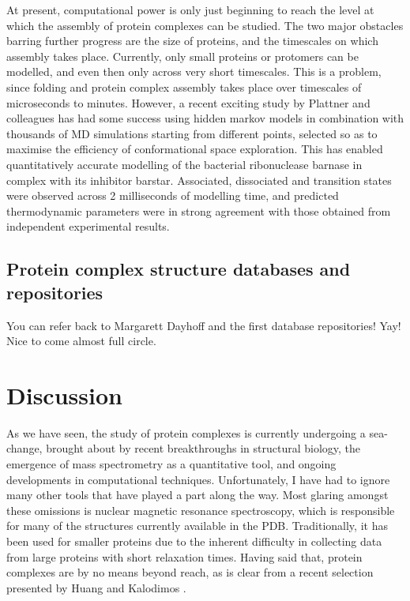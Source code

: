 \documentclass[a4paper,11pt,twoside,openright]{scrbook}
\begin{document}
At present, computational power is only just beginning to reach the level at which the assembly of protein complexes can be studied. The two major obstacles barring further progress are the size of proteins, and the timescales on which assembly takes place. Currently, only small proteins or protomers can be modelled, and even then only across very short timescales. This is a problem, since folding and protein complex assembly takes place over timescales of microseconds to minutes. However, a recent exciting study by Plattner and colleagues \cite{Plattner2017} has had some success using hidden markov models in combination with thousands of MD simulations starting from different points, selected so as to maximise the efficiency of conformational space exploration. This has enabled quantitatively accurate modelling of the bacterial ribonuclease barnase in complex with its inhibitor barstar. Associated, dissociated and transition states were observed across 2 milliseconds of modelling time, and predicted thermodynamic parameters were in strong agreement with those obtained from independent experimental results.

\subsection{Protein complex structure databases and repositories}
You can refer back to Margarett Dayhoff and the first database repositories! Yay! Nice to come almost full circle.

\section{Discussion}
As we have seen, the study of protein complexes is currently undergoing a sea-change, brought about by recent breakthroughs in structural biology, the emergence of mass spectrometry as a quantitative tool, and ongoing developments in computational techniques. Unfortunately, I have had to ignore many other tools that have played a part along the way. Most glaring amongst these omissions is nuclear magnetic resonance spectroscopy, which is responsible for many of the structures currently available in the PDB. Traditionally, it has been used for smaller proteins due to the inherent difficulty in collecting data from large proteins with short relaxation times. Having said that, protein complexes are by no means beyond reach, as is clear from a recent selection presented by Huang and Kalodimos \cite{Huang2017}.
\end{document}
